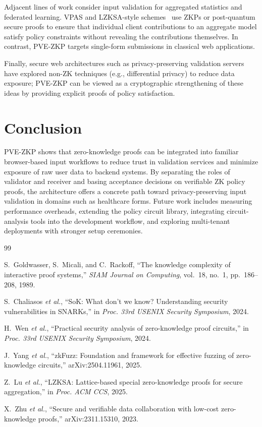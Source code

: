 \documentclass[conference]{IEEEtran}
\begin{document}
Adjacent lines of work consider input validation for aggregated statistics and
federated learning. VPAS and LZKSA-style schemes~\cite{lzksa,risefl} use ZKPs or
post-quantum secure proofs to ensure that individual client contributions to an
aggregate model satisfy policy constraints without revealing the contributions
themselves. In contrast, PVE-ZKP targets single-form submissions in classical
web applications.

Finally, secure web architectures such as privacy-preserving validation servers
have explored non-ZK techniques (e.g., differential privacy) to reduce data
exposure; PVE-ZKP can be viewed as a cryptographic strengthening of these ideas
by providing explicit proofs of policy satisfaction.

\section{Conclusion}

PVE-ZKP shows that zero-knowledge proofs can be integrated into familiar
browser-based input workflows to reduce trust in validation services and minimize
exposure of raw user data to backend systems. By separating the roles of
validator and receiver and basing acceptance decisions on verifiable ZK policy
proofs, the architecture offers a concrete path toward privacy-preserving input
validation in domains such as healthcare forms. Future work includes measuring
performance overheads, extending the policy circuit library, integrating
circuit-analysis tools into the development workflow, and exploring
multi-tenant deployments with stronger setup ceremonies.



\begin{thebibliography}{99}

S.~Goldwasser, S.~Micali, and C.~Rackoff,
``The knowledge complexity of interactive proof systems,''
\textit{SIAM Journal on Computing}, vol.~18, no.~1, pp.~186--208, 1989.

S.~Chaliasos \textit{et al.},
``SoK: What don't we know? Understanding security vulnerabilities in SNARKs,''
in \textit{Proc. 33rd USENIX Security Symposium}, 2024.

H.~Wen \textit{et al.},
``Practical security analysis of zero-knowledge proof circuits,''
in \textit{Proc. 33rd USENIX Security Symposium}, 2024.

J.~Yang \textit{et al.},
``zkFuzz: Foundation and framework for effective fuzzing of zero-knowledge circuits,''
arXiv:2504.11961, 2025.

Z.~Lu \textit{et al.},
``LZKSA: Lattice-based special zero-knowledge proofs for secure aggregation,''
in \textit{Proc. ACM CCS}, 2025.

X.~Zhu \textit{et al.},
``Secure and verifiable data collaboration with low-cost zero-knowledge proofs,''
arXiv:2311.15310, 2023.

\end{thebibliography}
\end{document}
